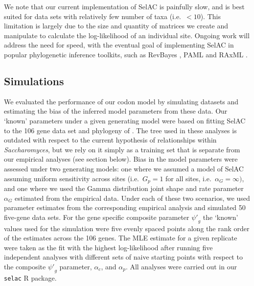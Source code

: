 \documentclass[onecolumn,letterpaper,fleqn,nogrid]{myMBE}%
\newcommand{\selac}{SelAC\xspace}
\newcommand{\alphac}{\ensuremath{\alpha_c}\xspace}
\newcommand{\alphag}{\ensuremath{\alpha_G}\xspace}
\newcommand{\alphap}{\ensuremath{\alpha_p}\xspace}
\newcommand{\psiprime}{\ensuremath{\psi'}\xspace}
\newcommand{\gp}{\ensuremath{{G_p}}\xspace}
\begin{document}
We note that our current implementation of \selac is painfully slow, and is best suited for data sets with relatively few number of taxa (i.e.~$<10$).
This limitation is largely due to the size and quantity of matrices we create and manipulate to calculate the log-likelihood of an individual site.
Ongoing work will address the need for speed, with the eventual goal of implementing \selac in popular phylogenetic inference toolkits, such as RevBayes \citep{revbayes}, PAML \citep{Yang2007} and RAxML \citep{Stamatakis2006}.

\subsection{Simulations}
We evaluated the performance of our codon model by simulating datasets and estimating the bias of the inferred model parameters from these data.
Our `known' parameters under a given generating model were based on fitting SelAC to the 106 gene data set and phylogeny of \citet{RokasEtAl2003}.
The tree used in these analyses is outdated with respect to the current hypothesis of relationships within \emph{Saccharomyces}, but we rely on it simply as a training set that is separate from our empirical analyses (see section below).
Bias in the model parameters were assessed under two generating models: one where we assumed a model of SelAC assuming uniform sensitivity across sites (i.e.~$\gp = 1$ for all sites, i.e.~$\alphag = \infty)$, and one where we used the Gamma distribution joint shape and rate parameter $\alphag$ estimated from the empirical data.
Under each of these two scenarios, we used parameter estimates from the corresponding empirical analysis and simulated 50 five-gene data sets.
For the gene specific composite parameter $\psiprime_g$ the `known' values used for the simulation were five evenly spaced points along the rank order of the estimates across the 106 genes.
The MLE estimate for a given replicate were taken as the fit with the highest log-likelihood after running five independent analyses with different sets of naive starting points with respect to the composite $\psiprime_g$ parameter, $\alphac$, and $\alphap$.
All analyses were carried out in our \texttt{selac} R package.
\end{document}
